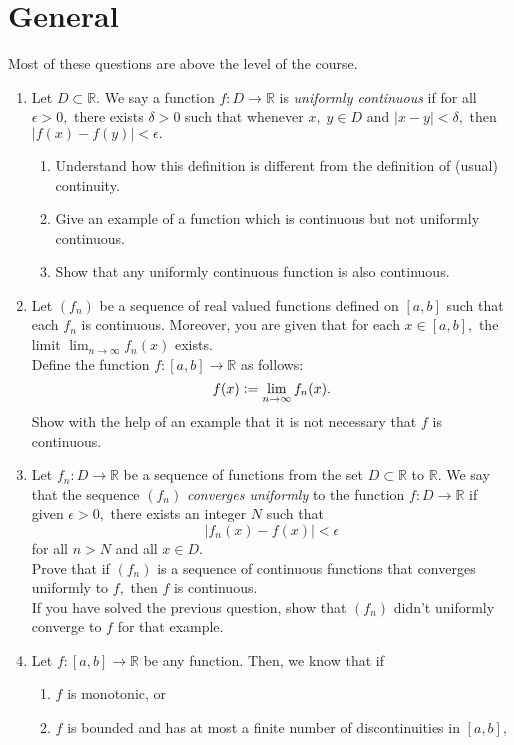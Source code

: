 \documentclass{article}
\begin{document}
\section{General}
Most of these questions are above the level of the course.
\begin{enumerate} 
	\item Let $D \subset \mathbb{R}.$ We say a function $f : D \to \mathbb{R}$ is \emph{uniformly continuous} if for all $\epsilon > 0,$ there exists $\delta > 0$ such that whenever $x,\;y \in D$ and $|x - y| < \delta,$ then $|f(x) - f(y)| < \epsilon.$
	\begin{enumerate} 
		\item Understand how this definition is different from the definition of (usual) continuity.
		\item Give an example of a function which is continuous but not uniformly continuous.
		\item Show that any uniformly continuous function is also continuous.
	\end{enumerate}
	\item Let $(f_n)$ be a sequence of real valued functions defined on $[a, b]$ such that each $f_n$ is continuous. Moreover, you are given that for each $x \in [a, b],$ the limit $\displaystyle\lim_{n\to \infty}f_n(x)$ exists. \\
	Define the function $f : [a, b] \to \mathbb{R}$ as follows:
	\[f(x) \vcentcolon= \lim_{n\to \infty}f_n(x).\]
	Show with the help of an example that it is not necessary that $f$ is continuous.
	\item Let $f_n : D \to \mathbb{R}$ be a sequence of functions from the set $D \subset \mathbb{R}$ to $\mathbb{R}.$ We say that the sequence $(f_n)$ \emph{converges uniformly} to the function $f:D \to \mathbb{R}$ if given $\epsilon > 0,$ there exists an integer $N$ such that
	\[|f_n(x) - f(x)| < \epsilon\]
	for all $n > N$ and all $x \in D.$\\
	Prove that if $(f_n)$ is a sequence of continuous functions that converges uniformly to $f,$ then $f$ is continuous.\\
	If you have solved the previous question, show that $(f_n)$ didn't uniformly converge to $f$ for that example.
	\item Let $f:[a, b] \to \mathbb{R}$ be any function. Then, we know that if
	\begin{enumerate} 
		\item $f$ is monotonic, or
		\item $f$ is bounded and has at most a finite number of discontinuities in $[a, b],$

\end{enumerate}
\end{enumerate}
\end{document}
